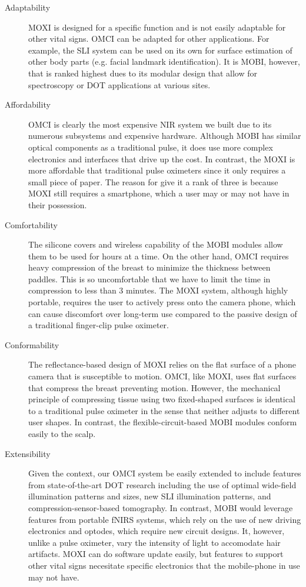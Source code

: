\begin{description}
   \item[Adaptability] \ac{MOXI} is designed for a specific function and is not easily adaptable for other vital signs. \ac{OMCI} can be adapted for other applications. For example, the \ac{SLI} system can be used on its own for surface estimation of other body parts (e.g. facial landmark identification). It is \ac{MOBI}, however, that is ranked highest dues to its modular design that allow for spectroscopy or \ac{DOT} applications at various sites. 
   
   \item[Affordability] \ac{OMCI} is clearly the most expensive \ac{NIR} system we built due to its numerous subsystems and expensive hardware. Although \ac{MOBI} has similar optical components as a traditional pulse, it does use more complex electronics and interfaces that drive up the cost. In contrast, the \ac{MOXI} is more affordable that traditional pulse oximeters since it only requires a small piece of paper. The reason for give it a rank of three is because \ac{MOXI} still requires a smartphone, which a user may or may not have in their possession. 
  
   \item[Comfortability] The silicone covers and wireless capability of the \ac{MOBI} modules allow them to be used for hours at a time. On the other hand, \ac{OMCI} requires heavy compression of the breast to minimize the thickness between paddles. This is so uncomfortable that we have to limit the time in compression to less than 3 minutes. The \ac{MOXI} system, although highly portable, requires the user to actively press onto the camera phone, which can cause discomfort over long-term use compared to the passive design of a traditional finger-clip pulse oximeter. 
   
   \item[Conformability] The reflectance-based design of \ac{MOXI} relies on the flat surface of a phone camera that is susceptible to motion. \ac{OMCI}, like \ac{MOXI}, uses flat surfaces that compress the breast preventing motion. However, the mechanical principle of compressing tissue using two fixed-shaped surfaces is identical to a traditional pulse oximeter in the sense that neither adjusts to different user shapes. In contrast, the flexible-circuit-based \ac{MOBI} modules conform easily to the scalp. 
   
   \item[Extensibility] Given the context, our \ac{OMCI} system be easily extended to include features from state-of-the-art \ac{DOT} research including the use of optimal wide-field illumination patterns and sizes, new \ac{SLI} illumination patterns, and compression-sensor-based tomography.  In contrast, \ac{MOBI} would leverage features from portable \ac{fNIRS} systems, which rely on the use of new driving electronics and optodes, which require new circuit designs. It, however, unlike a pulse oximeter, vary the intensity of light to accomodate hair artifacts. \ac{MOXI} can do software update easily, but features to support other vital signs necesitate specific electronics that the mobile-phone in use may not have. 
   

\end{description}

